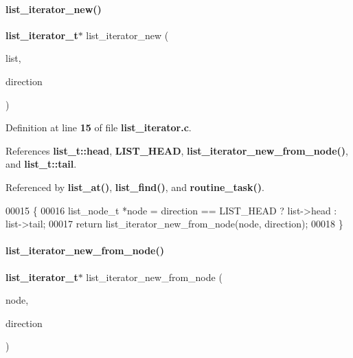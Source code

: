 \paragraph{list\+\_\+iterator\+\_\+new()}
{\footnotesize\ttfamily \textbf{ list\+\_\+iterator\+\_\+t}$\ast$ list\+\_\+iterator\+\_\+new (\begin{DoxyParamCaption}\item[{\textbf{ list\+\_\+t} $\ast$}]{list,  }\item[{\textbf{ list\+\_\+direction\+\_\+t}}]{direction }\end{DoxyParamCaption})}



Definition at line \textbf{ 15} of file \textbf{ list\+\_\+iterator.\+c}.



References \textbf{ list\+\_\+t\+::head}, \textbf{ L\+I\+S\+T\+\_\+\+H\+E\+AD}, \textbf{ list\+\_\+iterator\+\_\+new\+\_\+from\+\_\+node()}, and \textbf{ list\+\_\+t\+::tail}.



Referenced by \textbf{ list\+\_\+at()}, \textbf{ list\+\_\+find()}, and \textbf{ routine\+\_\+task()}.


\begin{DoxyCode}
00015                                                                              \{
00016   list_node_t *node = direction == LIST_HEAD ? list->head : list->tail;
00017   \textcolor{keywordflow}{return} list_iterator_new_from_node(node, direction);
00018 \}
\end{DoxyCode}
\mbox{\label{a00029_af4136a8a27bdc8c0f967a708dd03d575}} 
\paragraph{list\+\_\+iterator\+\_\+new\+\_\+from\+\_\+node()}
{\footnotesize\ttfamily \textbf{ list\+\_\+iterator\+\_\+t}$\ast$ list\+\_\+iterator\+\_\+new\+\_\+from\+\_\+node (\begin{DoxyParamCaption}\item[{\textbf{ list\+\_\+node\+\_\+t} $\ast$}]{node,  }\item[{\textbf{ list\+\_\+direction\+\_\+t}}]{direction }\end{DoxyParamCaption})}



